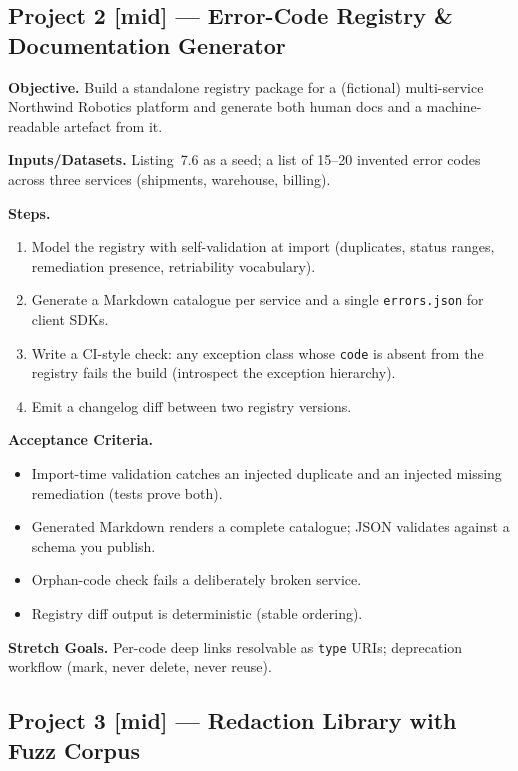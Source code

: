 \subsection{Project 2 [mid] --- Error-Code Registry \& Documentation Generator}

\textbf{Objective.} Build a standalone registry package for a (fictional)
multi-service Northwind Robotics platform and generate both human docs and a
machine-readable artefact from it.

\textbf{Inputs/Datasets.} Listing~7.6 as a seed; a list of 15--20 invented
error codes across three services (shipments, warehouse, billing).

\textbf{Steps.}
\begin{enumerate}
  \item Model the registry with self-validation at import (duplicates,
        status ranges, remediation presence, retriability vocabulary).
  \item Generate a Markdown catalogue per service and a single
        \texttt{errors.json} for client SDKs.
  \item Write a CI-style check: any exception class whose \texttt{code} is
        absent from the registry fails the build (introspect the exception
        hierarchy).
  \item Emit a changelog diff between two registry versions.
\end{enumerate}

\textbf{Acceptance Criteria.}
\begin{itemize}
  \item[$\square$] Import-time validation catches an injected duplicate and
        an injected missing remediation (tests prove both).
  \item[$\square$] Generated Markdown renders a complete catalogue; JSON
        validates against a schema you publish.
  \item[$\square$] Orphan-code check fails a deliberately broken service.
  \item[$\square$] Registry diff output is deterministic (stable ordering).
\end{itemize}

\textbf{Stretch Goals.} Per-code deep links resolvable as \texttt{type}
URIs; deprecation workflow (mark, never delete, never reuse).

\subsection{Project 3 [mid] --- Redaction Library with Fuzz Corpus}

